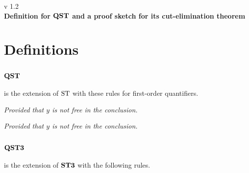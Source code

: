 \documentclass[a4paper, 12pt]{paper}
\begin{document}
{\noindent
	v 1.2 \\
{\large\textbf{Definition for $\qst$ and a proof sketch for its cut-elimination theorem}}
}
\\

\section{Definitions}

\subsection{$\qst$} is the extension of $\st$ with these rules for first-order quantifiers.

\begin{multicols}{2}
  \begin{prooftree}
  \end{prooftree}
  \columnbreak
  \begin{prooftree}
  \end{prooftree}
  \center
  \emph{Provided that $y$ is not free in the conclusion.}
\end{multicols}\vspace*{1em}
\begin{multicols}{2}
  \begin{prooftree}
  \end{prooftree}
  \center
  \emph{Provided that $y$ is not free in the conclusion.}
  \columnbreak
  \begin{prooftree}
  \end{prooftree}
\end{multicols}

\subsection{$\qstt$} is the extension of $\stt$ with the following rules.
\end{document}

